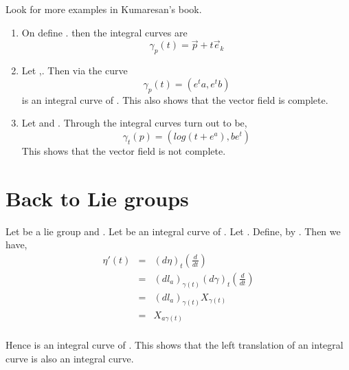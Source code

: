 \documentclass{article}
\begin{document}
\begin{example*}
    Look for more examples in Kumaresan's book.
    \begin{enumerate}
        \item On  define . then the integral curves are $$\gamma_p(t) = \vec{p}+t\vec{e}_k$$
        \item Let ,. Then via  the curve 
        $$\gamma_p(t) = (e^ta,e^tb)$$
        is an integral curve of . This also shows that the vector field is complete.
        \item Let  and . Through  the integral curves turn out to be,
        $$\gamma_t(p) = (log(t+e^a),be^t)$$
        This shows that the vector field is not complete.
    \end{enumerate}
\end{example*}

\section{Back to Lie groups}

Let  be a lie group and . Let  be an integral curve of . Let . Define,  by . Then we have,
\begin{eqnarray*}
    \eta'(t) &=& (d\eta)_t\left( \frac{d}{dt} \right)\\
    &=& (dl_a)_{\gamma(t)}(d\gamma)_t\left( \frac{d}{dt} \right)\\
    &=& (dl_a)_{\gamma(t)}X_{\gamma(t)}\\
    &=& X_{a\gamma(t)}\\
\end{eqnarray*}

Hence \mm{\eta} is an integral curve of . This shows that the left translation of an integral curve is also an integral curve.
\end{document}
